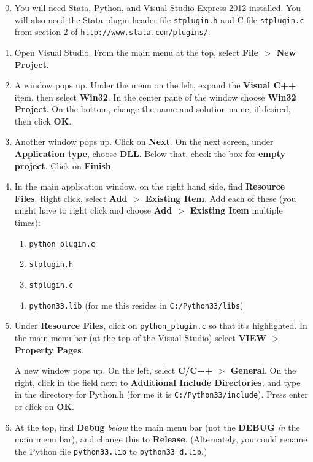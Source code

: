 \documentclass{article}
\begin{document}
	\begin{enumerate}
		\setcounter{enumi}{-1}
		\item You will need Stata, Python, and Visual Studio Express 2012 installed. You will also need the Stata plugin header file \lstinline$stplugin.h$ and C file \lstinline$stplugin.c$ from section 2 of \verb|http://www.stata.com/plugins/|.
		\item Open Visual Studio. From the main menu at the top, select \textbf{File $>$ New Project}.
		
		\item A window pops up. Under the menu on the left, expand the \textbf{Visual C++} item, then select \textbf{Win32}. In the center pane of the window choose \textbf{Win32 Project}. On the bottom, change the name and solution name, if desired, then click \textbf{OK}.
		
		\item Another window pops up. Click on \textbf{Next}. On the next screen, under \textbf{Application type}, choose \textbf{DLL}. Below that, check the box for \textbf{empty project}. Click on \textbf{Finish}.
		
		\item In the main application window, on the right hand side, find \textbf{Resource Files}. Right click, select \textbf{Add $>$ Existing Item}. Add each of these (you might have to right click and choose \textbf{Add $>$ Existing Item} multiple times):
			\begin{enumerate}
				\item \lstinline$python_plugin.c$
				\item \lstinline$stplugin.h$
				\item \lstinline$stplugin.c$
				\item \lstinline$python33.lib$ (for me this resides in \verb|C:/Python33/libs|)
			\end{enumerate}
		
		\item Under \textbf{Resource Files}, click on \lstinline$python_plugin.c$ so that it's highlighted. In the main menu bar (at the top of the Visual Studio) select \textbf{VIEW $>$ Property Pages}.
		
		A new window pops up. On the left, select \textbf{C/C++ $>$ General}. On the right, click in the field next to \textbf{Additional Include Directories}, and type in the directory for Python.h (for me it is \verb|C:/Python33/include|). Press enter or click on \textbf{OK}.
		
		\item At the top, find \textbf{Debug} \emph{below} the main menu bar (not the \textbf{DEBUG} \emph{in} the main menu bar), and change this to \textbf{Release}. (Alternately, you could rename the Python file \lstinline$python33.lib$ to \lstinline$python33_d.lib$.) 
		

\end{enumerate}
\end{document}
